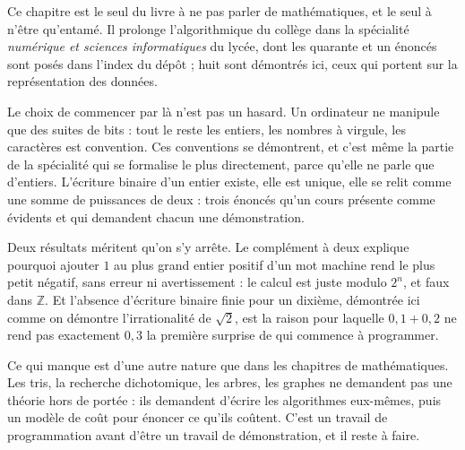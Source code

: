 Ce chapitre est le seul du livre à ne pas parler de mathématiques, et le seul à n'être
qu'entamé. Il prolonge l'algorithmique du collège dans la spécialité \emph{numérique et
sciences informatiques} du lycée, dont les quarante et un énoncés sont posés dans l'index
du dépôt ; huit sont démontrés ici, ceux qui portent sur la représentation des données.

Le choix de commencer par là n'est pas un hasard. Un ordinateur ne manipule que des suites
de bits : tout le reste \textemdash{} les entiers, les nombres à virgule, les caractères
\textemdash{} est convention. Ces conventions se démontrent, et c'est même la partie de la
spécialité qui se formalise le plus directement, parce qu'elle ne parle que d'entiers.
L'écriture binaire d'un entier existe, elle est unique, elle se relit comme une somme de
puissances de deux : trois énoncés qu'un cours présente comme évidents et qui demandent
chacun une démonstration.

Deux résultats méritent qu'on s'y arrête. Le complément à deux explique pourquoi ajouter
$1$ au plus grand entier positif d'un mot machine rend le plus petit négatif, sans erreur
ni avertissement : le calcul est juste modulo $2^n$, et faux dans $\mathbb{Z}$. Et
l'absence d'écriture binaire finie pour un dixième, démontrée ici comme on démontre
l'irrationalité de $\sqrt2$, est la raison pour laquelle $0{,}1 + 0{,}2$ ne rend pas
exactement $0{,}3$ \textemdash{} la première surprise de qui commence à programmer.

Ce qui manque est d'une autre nature que dans les chapitres de mathématiques. Les tris, la
recherche dichotomique, les arbres, les graphes ne demandent pas une théorie hors de
portée : ils demandent d'écrire les algorithmes eux-mêmes, puis un modèle de coût pour
énoncer ce qu'ils coûtent. C'est un travail de programmation avant d'être un travail de
démonstration, et il reste à faire.
